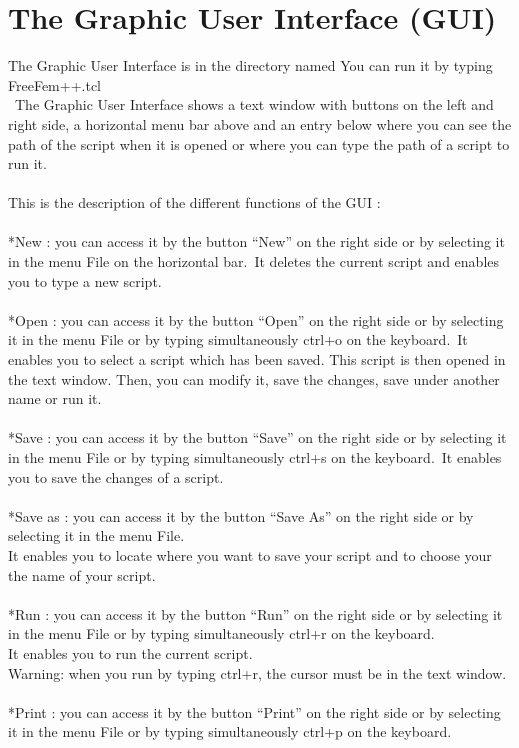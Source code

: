 \chapter{The Graphic User Interface (GUI)}
The Graphic User Interface is in the directory named 
You can run it by typing FreeFem++.tcl\\
\
The Graphic User Interface shows a text window with buttons on the left and right side, a horizontal menu bar above and an entry below where you can see the path of the script when it is opened or where you can type the path of a script to run it.\\
\\
This is the description of the different functions of the GUI :\\
\\
*New : you can access it by the button ``New'' on the right side or by selecting it in the menu File on the horizontal bar.\
It deletes the current script and enables you to type a new script.\\
\\
*Open : you can access it by the button ``Open'' on the right side or by selecting it in the menu File or by typing simultaneously ctrl+o on the keyboard.\
It enables you to select a script which has been saved. This script is then opened in the text window. Then, you can modify it, save the changes, save under another name or run it.\\
\\
*Save : you can access it by the button ``Save'' on the right side or by selecting it in the menu File or by typing simultaneously ctrl+s on the keyboard.\
It enables you to save the changes of a script.\\
\\
*Save as : you can access it by the button ``Save As'' on the right side or by selecting it in the menu File.\\
It enables you to locate where you want to save your script and to choose your the name of your script.\\
\\
*Run : you can access it by the button ``Run'' on the right side or by selecting it in the menu File or by typing simultaneously ctrl+r on the keyboard.\\
It enables you to run the current script.\\
Warning: when you run by typing ctrl+r, the cursor must be in the text window.\\
\\
*Print : you can access it by the button ``Print'' on the right side or by selecting it in the menu File or by typing simultaneously ctrl+p on the keyboard.\\
